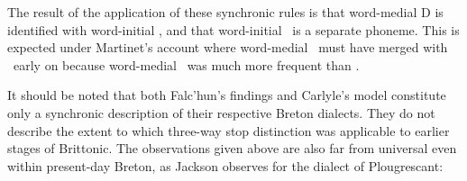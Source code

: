 The result of the application of these synchronic rules is that word-medial \gls{D} is identified with word-initial \lT, and that word-initial \xD\ is a separate phoneme. This is expected under Martinet's account where word-medial \xD\ must have merged with \lT\ early on because word-medial \lT\ was much more frequent than \xD.

It should be noted that both Falc'hun's findings and Carlyle's model constitute only a synchronic description of their respective Breton dialects. They do not describe the extent to which three-way stop distinction was applicable to earlier stages of Brittonic. The observations given above are also far from universal even within present-day Breton, as Jackson observes for the dialect of Plougrescant:




